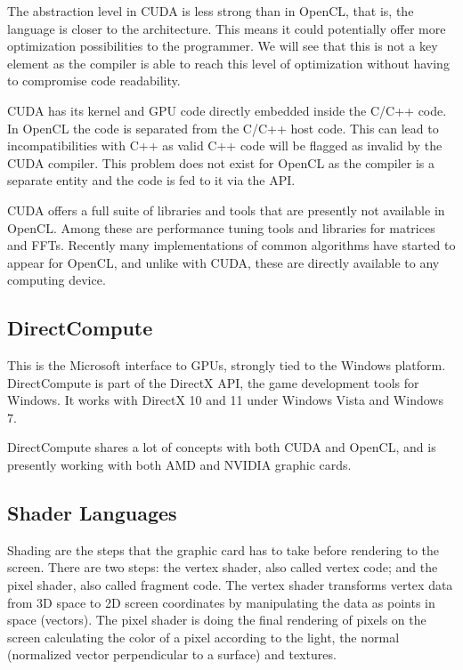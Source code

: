 The abstraction level in \gls{CUDA} is less strong than in \gls{OpenCL}, that is, the language is closer to the architecture. This means it could potentially offer more optimization possibilities to the programmer. We will see that this is not a key element as the compiler is able to reach this level of optimization without having to compromise code readability.

\Gls{CUDA} has its kernel and \gls{GPU} code directly embedded inside the C/C++ code. In \gls{OpenCL} the code is separated from the C/C++ host code. This can lead to incompatibilities with C++ as valid C++ code will be flagged as invalid by the \gls{CUDA} compiler. This problem does not exist for \gls{OpenCL} as the compiler is a separate entity and the code is fed to it via the \gls{API}. 

\Gls{CUDA} offers a full suite of libraries and tools that are presently not available in \gls{OpenCL}. Among these are performance tuning tools and libraries for matrices and \glspl{FFT}. Recently many implementations of common algorithms have started to appear for \gls{OpenCL}, and unlike with \gls{CUDA}, these are directly available to any computing device.

\subsection{DirectCompute}

This is the Microsoft interface to \glspl{GPU}, strongly tied to the Windows platform. DirectCompute is part of the DirectX API, the game development tools for Windows. It works with DirectX 10 and 11 under Windows Vista and Windows 7. 

DirectCompute shares a lot of concepts with both \gls{CUDA} and \gls{OpenCL}, and is presently working with both AMD and NVIDIA graphic cards.

\subsection{Shader Languages}

Shading are the steps that the graphic card has to take before rendering to the screen. There are two steps: the vertex shader, also called vertex code; and the pixel shader, also called fragment code. The vertex shader transforms vertex data from 3D space to 2D screen coordinates by manipulating the data as points in space (vectors). The pixel shader is doing the final rendering of pixels on the screen calculating the color of a pixel according to the light, the normal (normalized vector perpendicular to a surface) and textures. 

